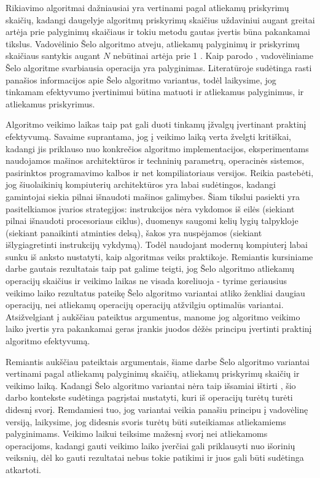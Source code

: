 \documentclass{VUMIFInfKursinis}
\begin{document}
Rikiavimo algoritmai dažniausiai yra vertinami pagal atliekamų priskyrimų skaičių, kadangi
daugelyje algoritmų priskyrimų skaičius uždaviniui augant greitai artėja prie palyginimų skaičiaus ir
tokiu metodu gautas įvertis būna pakankamai tikslus.
Vadovėlinio Šelo algoritmo atveju, atliekamų palyginimų ir priskyrimų skaičiaus santykis augant $N$ nebūtinai artėja prie 1 \cite{Radavičius_Baranauskas_2013}.
Kaip parodo \cite{ciura2001best}, vadovėliniame Šelo algoritme svarbiausia operacija yra palyginimas.
Literatūroje sudėtinga rasti panašios informacijos apie Šelo algoritmo variantus,
todėl laikysime, jog tinkamam efektyvumo įvertinimui būtina matuoti ir atliekamus palyginimus, ir atliekamus priskyrimus.

Algoritmo veikimo laikas taip pat gali duoti tinkamų įžvalgų įvertinant praktinį efektyvumą.
Savaime suprantama, jog į veikimo laiką verta žvelgti kritiškai, kadangi jis priklauso nuo konkrečios algoritmo implementacijos,
eksperimentams naudojamos mašinos architektūros ir techninių parametrų, operacinės sistemos, pasirinktos programavimo kalbos ir net kompiliatoriaus versijos.
Reikia pastebėti, jog šiuolaikinių kompiuterių architektūros yra labai sudėtingos, kadangi gamintojai siekia pilnai išnaudoti mašinos galimybes.
Šiam tikslui pasiekti yra pasitelkiamos įvarios strategijos:
instrukcijos nėra vykdomos iš eilės (siekiant pilnai išnaudoti procesoriaus ciklus),
duomenys saugomi kelių lygių talpykloje (siekiant panaikinti atminties delsą),
šakos yra nuspėjamos (siekiant išlygiagretinti instrukcijų vykdymą).
Todėl naudojant modernų kompiuterį labai sunku iš anksto nustatyti, kaip algoritmas veiks praktikoje. 
Remiantis kursiniame darbe gautais rezultatais taip pat galime teigti, jog Šelo algoritmo atliekamų operacijų skaičius ir veikimo laikas ne visada koreliuoja -
tyrime geriausius veikimo laiko rezultatus pateikę Šelo algoritmo variantai atliko ženkliai daugiau operacijų, nei atliekamų operacijų operacijų atžvilgiu optimalūs variantai.
Atsižvelgiant į aukščiau pateiktus argumentus, manome jog
algoritmo veikimo laiko įvertis yra pakankamai geras įrankis juodos dėžės principu įvertinti praktinį algoritmo efektyvumą.

Remiantis aukščiau pateiktais argumentais, šiame darbe Šelo algoritmo variantai vertinami pagal
atliekamų palyginimų skaičių, atliekamų priskyrimų skaičių ir veikimo laiką.
Kadangi Šelo algoritmo variantai nėra taip išsamiai ištirti \cite{brejova2001analyzing},
šio darbo kontekste sudėtinga pagrįstai nustatyti, kuri iš operacijų turėtų turėti didesnį svorį.
Remdamiesi tuo, jog variantai veikia panašiu principu į vadovėlinę versiją, laikysime, jog  
didesnis svoris turėtų būti suteikiamas atliekamiems palyginimams.
Veikimo laikui teiksime mažesnį svorį nei atliekamoms operacijoms, kadangi gauti veikimo laiko įverčiai gali priklausyti nuo išorinių veiksnių,
dėl ko gauti rezultatai nebus tokie patikimi ir juos gali būti sudėtinga atkartoti.
\end{document}
